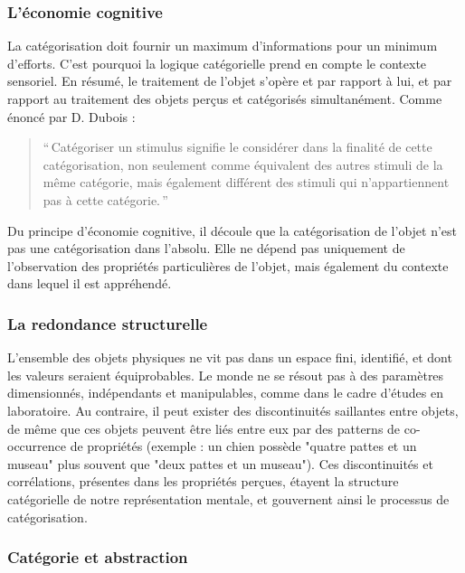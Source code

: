 {\subsubsection{L'économie cognitive}

La catégorisation doit fournir un maximum d'informations pour un minimum d'efforts. C'est pourquoi la logique catégorielle prend en compte le contexte sensoriel. En résumé, le traitement de l'objet s'opère et par rapport à lui, et par rapport au traitement des objets perçus et catégorisés simultanément. Comme énoncé par D. Dubois \citep[p. 33]{dubois1991semantique}:

\begin{quote}
``\,Catégoriser un stimulus signifie le considérer dans la finalité de cette catégorisation, non seulement comme équivalent des autres stimuli de la même catégorie, mais également différent des stimuli qui n'appartiennent pas à cette catégorie.\,''
\end{quote}

Du principe d'économie cognitive, il découle que la catégorisation de l'objet n'est pas une catégorisation dans l'absolu. Elle ne dépend pas uniquement de l'observation des propriétés particulières de l'objet, mais également du contexte dans lequel il est appréhendé.

\subsubsection{La redondance structurelle}

L'ensemble des objets physiques ne vit pas dans un espace fini, identifié, et dont les valeurs seraient équiprobables. Le monde ne se résout pas à des paramètres dimensionnés, indépendants et manipulables, comme dans le cadre d'études en laboratoire. Au contraire, il peut exister des discontinuités saillantes entre objets, de même que ces objets peuvent être liés entre eux par des patterns de co-occurrence de propriétés (exemple : un chien possède "quatre pattes et un museau" plus souvent que "deux pattes et un museau"). Ces discontinuités et corrélations, présentes dans les propriétés perçues, étayent la structure catégorielle de notre représentation mentale, et gouvernent ainsi le processus de catégorisation.
 
\subsubsection{Catégorie et abstraction}
 \label{sec:ch3_categoEtAbstract}
 
}
